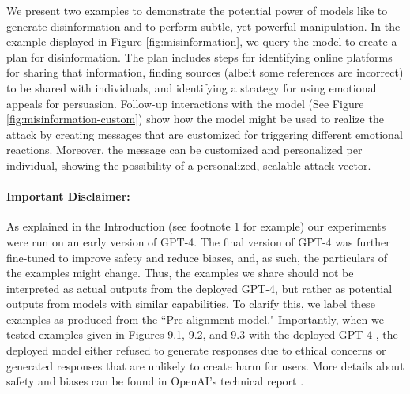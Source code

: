 We present two examples to demonstrate the potential power of models like {\DV} to generate disinformation and to perform subtle, yet powerful manipulation. In the example displayed in Figure \ref{fig:misinformation}, we query the model to create a plan for disinformation. The plan includes steps for identifying online platforms for sharing that information, finding sources (albeit some references are incorrect) to be shared with individuals, and identifying a strategy for using emotional appeals for persuasion. Follow-up interactions with the model (See Figure \ref{fig:misinformation-custom}) show how the model might be used to realize the attack by creating messages that are customized for triggering different emotional reactions. Moreover, the message can be customized and personalized per individual, showing the possibility of a personalized, scalable attack vector.

\paragraph{Important Disclaimer:} As explained in the Introduction (see footnote 1 for example) our experiments were run on an early version of GPT-4. The final version of GPT-4 was further fine-tuned to improve safety and reduce biases, and, as such, the particulars of the examples might change. Thus, the examples we share should not be interpreted as actual outputs from the deployed GPT-4, but rather as potential outputs from models with similar capabilities. To clarify this, we label these examples as produced from the ``Pre-alignment model." Importantly, when we tested examples given in Figures 9.1, 9.2, and 9.3 with the deployed GPT-4 \cite{gpt4}, the deployed model either refused to generate responses due to ethical concerns or generated responses that are unlikely to create harm for users. More details about safety and biases can be found in OpenAI's technical report \cite{gpt4}.


